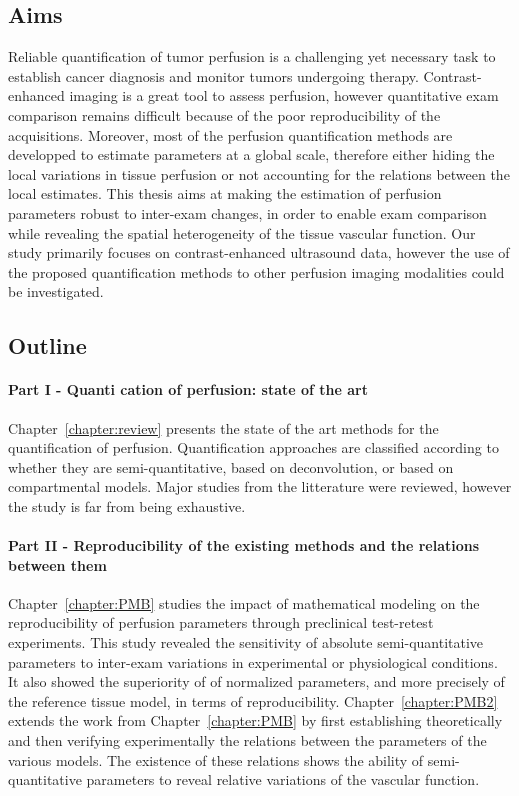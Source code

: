 \subsection{Aims}
Reliable quantification of tumor perfusion is a challenging yet necessary task to establish cancer diagnosis and monitor tumors undergoing therapy.
Contrast-enhanced imaging is a great tool to assess perfusion, however quantitative exam comparison remains difficult because of the poor reproducibility of the acquisitions.
Moreover, most of the perfusion quantification methods are developped to estimate parameters at a global scale, therefore either hiding the local variations in tissue perfusion or not accounting for the relations between the local estimates.
This thesis aims at making the estimation of perfusion parameters robust to inter-exam changes, in order to enable exam comparison while revealing the spatial heterogeneity of the tissue vascular function.
Our study primarily focuses on contrast-enhanced ultrasound data, however the use of the proposed quantification methods to other perfusion imaging modalities could be investigated.

\subsection{Outline}
\paragraph{Part I - Quanti cation of perfusion: state of the art}
Chapter~\ref{chapter:review} presents the state of the art methods for the quantification of perfusion.
Quantification approaches are classified according to whether they are semi-quantitative, based on deconvolution, or based on compartmental models.
Major studies from the litterature were reviewed, however the study is far from being exhaustive.

\paragraph{Part II - Reproducibility of the existing methods and the relations between them}
Chapter~\ref{chapter:PMB} studies the impact of mathematical modeling on the reproducibility of perfusion parameters through preclinical test-retest experiments.
This study revealed the sensitivity of absolute semi-quantitative parameters to inter-exam variations in experimental or physiological conditions.
It also showed the superiority of of normalized parameters, and more precisely of the reference tissue model, in terms of reproducibility.
Chapter~\ref{chapter:PMB2} extends the work from Chapter~\ref{chapter:PMB} by first establishing theoretically and then verifying experimentally the relations between the parameters of the various models.
The existence of these relations shows the ability of semi-quantitative parameters to reveal relative variations of the vascular function.

